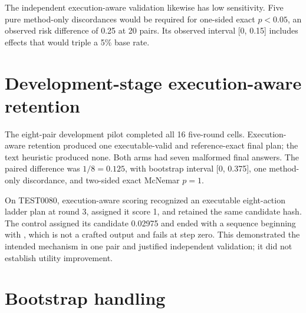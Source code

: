 The independent execution-aware validation likewise has low sensitivity. Five pure method-only discordances would be required for one-sided exact \(p<0.05\), an observed risk difference of 0.25 at 20 pairs. Its observed interval [0, 0.15] includes effects that would triple a 5\% base rate.

\section{Development-stage execution-aware retention}

The eight-pair development pilot completed all 16 five-round cells. Execution-aware retention produced one executable-valid and reference-exact final plan; the text heuristic produced none. Both arms had seven malformed final answers. The paired difference was \(1/8=0.125\), with bootstrap interval [0, 0.375], one method-only discordance, and two-sided exact McNemar \(p=1\).

\begin{center}
\end{center}

On TEST0080, execution-aware scoring recognized an executable eight-action ladder plan at round 3, assigned it score 1, and retained the same candidate hash. The control assigned its candidate 0.02975 and ended with a sequence beginning with \texttt{}, which is not a crafted output and fails at step zero. This demonstrated the intended mechanism in one pair and justified independent validation; it did not establish utility improvement.

\section{Bootstrap handling}

